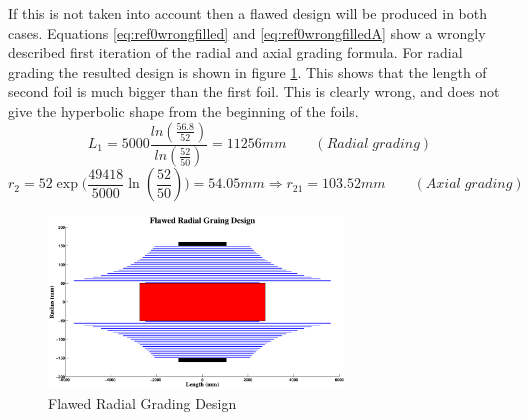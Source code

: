 If this is not taken into account then a flawed design will be produced in both cases.
Equations \ref{eq:ref0wrongfilled} and \ref{eq:ref0wrongfilledA} show a wrongly described first iteration of the radial and axial grading formula. For radial grading the resulted design is shown in figure \ref{figure:flawedgraph}. This shows that the length of second foil is much bigger than the first foil. This is clearly wrong, and does not give the hyperbolic shape from the beginning of the foils.
\begin{equation}
   \label{eq:ref0wrongfilled}
   L_{1} = 5000\displaystyle\frac{{ln(\displaystyle\frac{56.8}{52})} }{ln(\displaystyle\frac{52}{50})}
   = 11256mm \qquad (Radial \; grading)
\end{equation}
\begin{equation}
\label{eq:ref0wrongfilledA}
   r_2 = 52 \displaystyle \exp\big( \frac{49418}{5000} \ln(\frac{52}{50})\big)= 54.05mm\Longrightarrow r_{21}=103.52mm \qquad (Axial \; grading)
\end{equation}

\begin{figure}[!h]
   \centering
   \includegraphics[width = 0.7\textwidth]{../Matlab_Calculations/Matlab_David/FlawedRadGradGraph.eps}
   \caption{Flawed Radial Grading Design}
   \label{figure:flawedgraph}
\end{figure}

